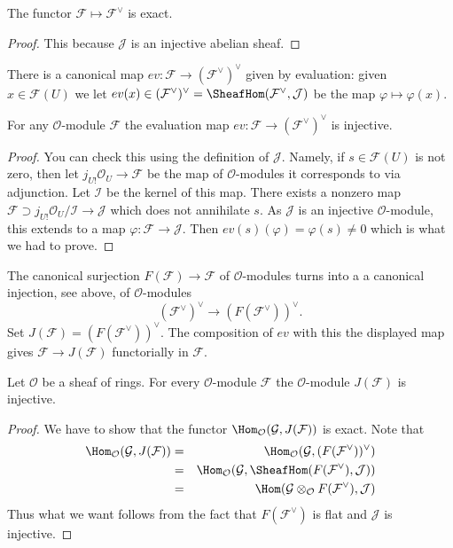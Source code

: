 \begin{lemma}
\label{lemma-vee-exact-sheaves}
The functor $\mathcal{F} \mapsto \mathcal{F}^\vee$ is exact.
\end{lemma}

\begin{proof}
This because $\mathcal{J}$ is an injective abelian sheaf.
\end{proof}

\noindent
There is a canonical map $ev : \mathcal{F} \to (\mathcal{F}^\vee)^\vee$
given by evaluation: given $x \in \mathcal{F}(U)$ we let
$ev(x) \in (\mathcal{F}^\vee)^\vee =
\SheafHom(\mathcal{F}^\vee, \mathcal{J})$
be the map $\varphi \mapsto \varphi(x)$.

\begin{lemma}
\label{lemma-ev-injective-sheaves}
For any $\mathcal{O}$-module $\mathcal{F}$ the evaluation map
$ev : \mathcal{F} \to (\mathcal{F}^\vee)^\vee$ is injective.
\end{lemma}

\begin{proof}
You can check this using the definition of $\mathcal{J}$.
Namely, if $s \in \mathcal{F}(U)$ is not zero, then let
$j_{U!}\mathcal{O}_U \to \mathcal{F}$ be the map of
$\mathcal{O}$-modules it corresponds to via adjunction.
Let $\mathcal{I}$ be the kernel of this map. There exists
a nonzero map $\mathcal{F} \supset j_{U!}\mathcal{O}_U/\mathcal{I}
\to \mathcal{J}$ which does not annihilate $s$. As $\mathcal{J}$ is
an injective $\mathcal{O}$-module, this extends to a map
$\varphi : \mathcal{F} \to \mathcal{J}$.
Then $ev(s)(\varphi) = \varphi(s) \not = 0$ which is what we had to prove.
\end{proof}

\noindent
The canonical surjection
$F(\mathcal{F}) \to \mathcal{F}$ of $\mathcal{O}$-modules turns into a
a canonical injection, see above, of $\mathcal{O}$-modules
$$
(\mathcal{F}^\vee)^\vee \longrightarrow (F(\mathcal{F}^\vee))^\vee.
$$
Set $J(\mathcal{F}) = (F(\mathcal{F}^\vee))^\vee$.
The composition of $ev$ with this
the displayed map gives
$\mathcal{F} \to J(\mathcal{F})$ functorially in $\mathcal{F}$.

\begin{lemma}
\label{lemma-JM-injective-sheaves}
Let $\mathcal{O}$ be a sheaf of rings.
For every $\mathcal{O}$-module $\mathcal{F}$ the
$\mathcal{O}$-module $J(\mathcal{F})$ is injective.
\end{lemma}

\begin{proof}
We have to show that the functor
$\Hom_\mathcal{O}(\mathcal{G}, J(\mathcal{F}))$
is exact. Note that
\begin{eqnarray*}
\Hom_\mathcal{O}(\mathcal{G}, J(\mathcal{F}))
& = &
\Hom_\mathcal{O}(\mathcal{G}, (F(\mathcal{F}^\vee))^\vee) \\
& = &
\Hom_\mathcal{O}
(\mathcal{G}, \SheafHom(F(\mathcal{F}^\vee), \mathcal{J})) \\
& = &
\Hom(\mathcal{G} \otimes_\mathcal{O} F(\mathcal{F}^\vee), \mathcal{J})
\end{eqnarray*}
Thus what we want follows from the fact that $F(\mathcal{F}^\vee)$
is flat and $\mathcal{J}$ is injective.
\end{proof}


